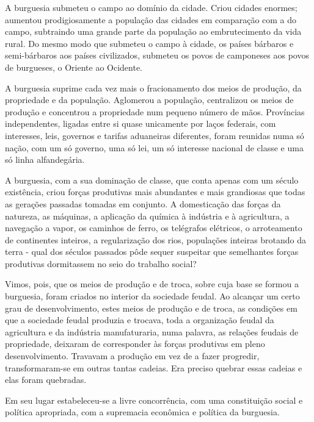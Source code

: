 A burguesia submeteu o campo ao domínio da cidade. Criou cidades
enormes; aumentou prodigiosamente a população das cidades em
comparação com a do campo, subtraindo uma grande parte da população ao
embrutecimento da vida rural. Do mesmo modo que submeteu o campo à
cidade, os países bárbaros e semi-bárbaros aos países civilizados,
submeteu os povos de camponeses aos povos de burgueses, o Oriente ao
Ocidente.

A burguesia suprime cada vez mais o fracionamento dos meios de
produção, da propriedade e da população. Aglomerou a população,
centralizou os meios de produção e concentrou a propriedade num
pequeno número de mãos. Províncias independentes, ligadas entre si
quase unicamente por laços federais, com interesses, leis, governos e
tarifas aduaneiras diferentes, foram reunidas numa só nação, com um só
governo, uma só lei, um só interesse nacional de classe e uma só linha
alfandegária.

A burguesia, com a sua dominação de classe, que conta apenas com um
século existência, criou forças produtivas mais abundantes e mais
grandiosas que todas as gerações passadas tomadas em conjunto. A
domesticação das forças da natureza, as máquinas, a aplicação da
química à indústria e à agricultura, a navegação a vapor, os caminhos
de ferro, os telégrafos elétricos, o arroteamento de continentes
inteiros, a regularização dos rios, populações inteiras brotando da
terra - qual dos séculos passados pôde sequer suspeitar que
semelhantes forças produtivas dormitassem no seio do trabalho social?

Vimos, pois, que os meios de produção e de troca, sobre cuja base se
formou a burguesia, foram criados no interior da sociedade feudal. Ao
alcançar um certo grau de desenvolvimento, estes meios de produção e
de troca, as condições em que a sociedade feudal produzia e trocava,
toda a organização feudal da agricultura e da indústria manufaturaria,
numa palavra, as relações feudais de propriedade, deixaram de
corresponder às forças produtivas em pleno desenvolvimento. Travavam a
produção em vez de a fazer progredir, transformaram-se em outras
tantas cadeias. Era preciso quebrar essas cadeias e elas foram
quebradas.

Em seu lugar estabeleceu-se a livre concorrência, com uma constituição
social e política apropriada, com a supremacia econômica e política da
burguesia.

